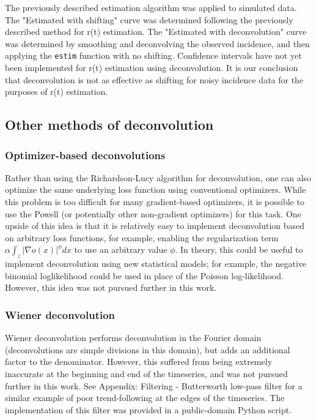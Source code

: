 \documentclass{article}
\newcommand{\code}[1]{\texttt{#1}}
\begin{document}
{The previously described estimation algorithm was applied to simulated data. The "Estimated with shifting" curve was determined following the previously described method for r(t) estimation. The "Estimated with deconvolution" curve was determined by smoothing and deconvolving the observed incidence, and then applying the \code{estim} function with no shifting. Confidence intervals have not yet been implemented for r(t) estimation using deconvolution. 
It is our conclusion that deconvolution is not as effective as shifting for noisy incidence data for the purposes of r(t) estimation.

\subsection{Other methods of deconvolution}
\subsubsection{Optimizer-based deconvolutions}
Rather than using the Richardson-Lucy algorithm for deconvolution, one can also optimize the same underlying loss function using conventional optimizers. While this problem is too difficult for many gradient-based optimizers, it is possible to use the Powell (or potentially other non-gradient optimizers) for this task. One upside of this idea is that it is relatively easy to implement deconvolution based on arbitrary loss functions, for example, enabling the regularization term $\alpha \int_z |\nabla o(x)|^\phi dx$ to use an arbitrary value $\phi$. In theory, this could be useful to implement deconvolution using  new statistical models; for example, the negative binomial loglikelihood could be used in place of the Poisson log-likelihood. However, this idea was not pursued further in this work.

\subsubsection{Wiener deconvolution}
Wiener deconvolution performs deconvolution in the Fourier domain (deconvolutions are simple divisions in this domain), but adds an additional factor to the denominator. However, this suffered from being extremely inaccurate at the beginning and end of the timeseries, and was not pursued further in this work. See Appendix: Filtering - Butterworth low-pass filter for a similar example of poor trend-following at the edges of the timeseries. The implementation of this filter was provided in a public-domain Python script. \cite{wienerimplementation}

}
\end{document}

